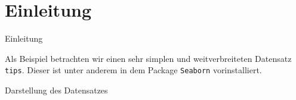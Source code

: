 \section{Einleitung}

\begin{frame}{Einleitung}

    Als Beispiel betrachten wir einen sehr simplen und weitverbreiteten Datensatz \lstinline{tips}. Dieser ist unter anderem in dem Package \lstinline{Seaborn} vorinstalliert.
    
    \begin{table}
        \centering
        
        \caption{Darstellung des Datensatzes}
        \label{tab:datahead}
    \end{table}

\end{frame}
